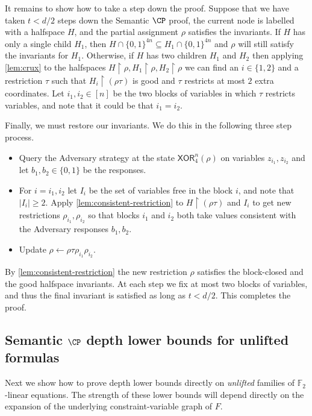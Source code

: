 \documentclass[11pt]{article}
\numberwithin{equation}{section}
\theoremstyle{definition}
\theoremstyle{plain}
\newcommand{\set}[1]{\{ #1 \}}
\renewcommand{\restriction}{\!\!\upharpoonright}
\newcommand{\boolcube}{\ensuremath{\{0,1\}}}
\newcommand{\XOR}{\ensuremath{\mathsf{XOR}}}
\renewcommand{\restriction}{\!\ensuremath{\upharpoonright}\!}
\begin{document}
	
It remains to show how to take a step down the proof. 
Suppose that we have taken $t < d/2$ steps down the Semantic $\CP$ proof, the current node is labelled with a halfspace $H$, and the partial assignment $\rho$ satisfies the invariants.
If $H$ has only a single child $H_1$, then $H \cap \set{0,1}^{4n} \subseteq H_1 \cap \boolcube^{4n}$ and $\rho$ will still satisfy the invariants for $H_1$.
Otherwise, if $H$ has two children $H_1$ and $H_2$ then applying \autoref{lem:crux} to the halfspaces $H \restriction \rho, H_1 \restriction \rho, H_2 \restriction \rho$ we can find an $i \in \{1,2\}$ and a restriction $\tau$  such that $H_i \restriction (\rho\tau)$ is good and $\tau$ restricts at most $2$ extra coordinates.
Let $i_1, i_2 \in [n]$ be the two blocks of variables in which $\tau$ restricts variables, and note that it could be that $i_1 = i_2$.
	
Finally, we must restore our invariants.
We do this in the following three step process.
\begin{itemize}
	\item Query the Adversary strategy at the state $\XOR_4^n(\rho)$ on variables $z_{i_1}, z_{i_2}$ and let $b_1, b_2 \in \{0,1\}$ be the responses.
	\item For $i = i_1, i_2$ let $I_i$ be the set of variables free in the block $i$, and note that $|I_i| \geq 2$. 
		Apply \autoref{lem:consistent-restriction} to $H \restriction (\rho\tau)$ and $I_i$ to get new restrictions $\rho_{i_1}, \rho_{i_2}$ so that blocks $i_1$ and $i_2$ both take values consistent with the Adversary responses $b_1, b_2$.
	\item Update $\rho \leftarrow \rho\tau\rho_{i_1}\rho_{i_2}$.
\end{itemize} 
By \autoref{lem:consistent-restriction} the new restriction $\rho$ satisfies the block-closed and the good halfspace invariants.
At each step we fix at most two blocks of variables, and thus the final invariant is satisfied as long as $t < d/2$.
This completes the proof.




\subsection{Semantic \texorpdfstring{$\CP$}{CP} depth lower bounds for unlifted
  formulas}
Next we show how to prove depth lower bounds directly on \emph{unlifted} families of $\mathbb{F}_2$-linear equations. The strength of these lower bounds will depend directly on the expansion of the underlying constraint-variable graph of $F$. 
\end{document}
